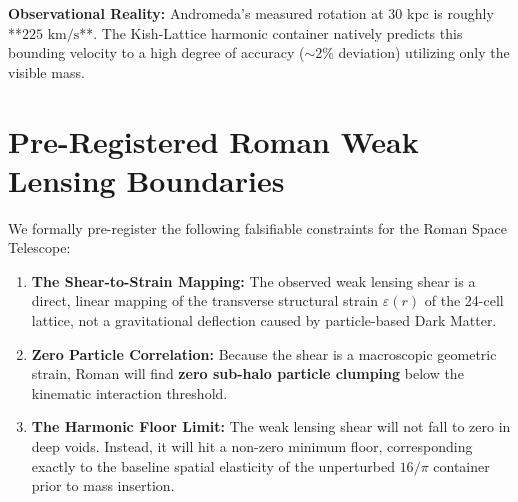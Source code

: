 \documentclass[11pt, letterpaper, openany]{book}
\begin{document}
\textbf{Observational Reality:} Andromeda's measured rotation at 30 kpc is roughly **$225 \text{ km/s}$**. The Kish-Lattice harmonic container natively predicts this bounding velocity to a high degree of accuracy ($\sim 2\%$ deviation) utilizing only the visible mass. 

\vspace{0.5cm}
\begin{center}
\end{center}

\section{Pre-Registered Roman Weak Lensing Boundaries}

We formally pre-register the following falsifiable constraints for the Roman Space Telescope:

\begin{enumerate}
    \item \textbf{The Shear-to-Strain Mapping:} The observed weak lensing shear is a direct, linear mapping of the transverse structural strain $\varepsilon(r)$ of the 24-cell lattice, not a gravitational deflection caused by particle-based Dark Matter. 
    \item \textbf{Zero Particle Correlation:} Because the shear is a macroscopic geometric strain, Roman will find \textbf{zero sub-halo particle clumping} below the kinematic interaction threshold. 
    \item \textbf{The Harmonic Floor Limit:} The weak lensing shear will not fall to zero in deep voids. Instead, it will hit a non-zero minimum floor, corresponding exactly to the baseline spatial elasticity of the unperturbed $16/\pi$ container prior to mass insertion.
\end{enumerate}
\end{document}
